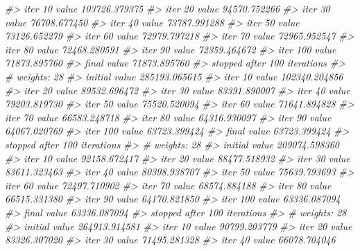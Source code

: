 \documentclass[
  graybox,natbib,nospthms]{svmono}
\newenvironment{Shaded}{\begin{snugshade}}{\end{snugshade}}
\newcommand{\CommentTok}[1]{\textcolor[rgb]{0.37,0.37,0.37}{\textit{#1}}}
\begin{document}
\begin{Shaded}
\begin{Highlighting}[]
\CommentTok{\#\textgreater{} iter  10 value 103726.379375}
\CommentTok{\#\textgreater{} iter  20 value 94570.752266}
\CommentTok{\#\textgreater{} iter  30 value 76708.677450}
\CommentTok{\#\textgreater{} iter  40 value 73787.991288}
\CommentTok{\#\textgreater{} iter  50 value 73126.652279}
\CommentTok{\#\textgreater{} iter  60 value 72979.797218}
\CommentTok{\#\textgreater{} iter  70 value 72965.952547}
\CommentTok{\#\textgreater{} iter  80 value 72468.280591}
\CommentTok{\#\textgreater{} iter  90 value 72359.464672}
\CommentTok{\#\textgreater{} iter 100 value 71873.895760}
\CommentTok{\#\textgreater{} final  value 71873.895760 }
\CommentTok{\#\textgreater{} stopped after 100 iterations}
\CommentTok{\#\textgreater{} \# weights:  28}
\CommentTok{\#\textgreater{} initial  value 285193.065615 }
\CommentTok{\#\textgreater{} iter  10 value 102340.204856}
\CommentTok{\#\textgreater{} iter  20 value 89532.696472}
\CommentTok{\#\textgreater{} iter  30 value 83391.890007}
\CommentTok{\#\textgreater{} iter  40 value 79203.819730}
\CommentTok{\#\textgreater{} iter  50 value 75520.520094}
\CommentTok{\#\textgreater{} iter  60 value 71641.894828}
\CommentTok{\#\textgreater{} iter  70 value 66583.248718}
\CommentTok{\#\textgreater{} iter  80 value 64316.930097}
\CommentTok{\#\textgreater{} iter  90 value 64067.020769}
\CommentTok{\#\textgreater{} iter 100 value 63723.399424}
\CommentTok{\#\textgreater{} final  value 63723.399424 }
\CommentTok{\#\textgreater{} stopped after 100 iterations}
\CommentTok{\#\textgreater{} \# weights:  28}
\CommentTok{\#\textgreater{} initial  value 209074.598360 }
\CommentTok{\#\textgreater{} iter  10 value 92158.672417}
\CommentTok{\#\textgreater{} iter  20 value 88477.518932}
\CommentTok{\#\textgreater{} iter  30 value 83611.323463}
\CommentTok{\#\textgreater{} iter  40 value 80398.938707}
\CommentTok{\#\textgreater{} iter  50 value 75639.793693}
\CommentTok{\#\textgreater{} iter  60 value 72497.710902}
\CommentTok{\#\textgreater{} iter  70 value 68574.884188}
\CommentTok{\#\textgreater{} iter  80 value 66515.331380}
\CommentTok{\#\textgreater{} iter  90 value 64170.821850}
\CommentTok{\#\textgreater{} iter 100 value 63336.087094}
\CommentTok{\#\textgreater{} final  value 63336.087094 }
\CommentTok{\#\textgreater{} stopped after 100 iterations}
\CommentTok{\#\textgreater{} \# weights:  28}
\CommentTok{\#\textgreater{} initial  value 264913.914581 }
\CommentTok{\#\textgreater{} iter  10 value 90799.203779}
\CommentTok{\#\textgreater{} iter  20 value 83326.307020}
\CommentTok{\#\textgreater{} iter  30 value 71495.281328}
\CommentTok{\#\textgreater{} iter  40 value 66078.704046}

\end{Highlighting}
\end{Shaded}
\end{document}
